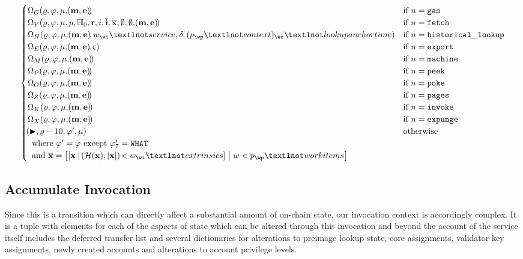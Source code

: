 \begin{align}
\begin{cases}
      \Omega_G(\gascounter, \registers, \memory, \tup{\mathbf{m}, \mathbf{e}}) &\when n = \mathtt{gas} \\
      \Omega_Y(\gascounter, \registers, \memory, p, \zerohash, \mathbf{r}, i, \overline{\mathbf{i}}, \overline{\mathbf{x}}, \none, \none, \tup{\mathbf{m}, \mathbf{e}}) &\when n = \mathtt{fetch}\\
      \Omega_H(\gascounter, \registers, \memory, \tup{\mathbf{m}, \mathbf{e}}, w_\wi¬service, \accounts, (p_\wp¬context)_\wc¬lookupanchortime) &\when n = \mathtt{historical\_lookup}\\
      \Omega_E(\gascounter, \registers, \memory, \tup{\mathbf{m}, \mathbf{e}}, \segoff) &\when n = \mathtt{export}\\
      \Omega_M(\gascounter, \registers, \memory, \tup{\mathbf{m}, \mathbf{e}}) &\when n = \mathtt{machine}\\
      \Omega_P(\gascounter, \registers, \memory, \tup{\mathbf{m}, \mathbf{e}}) &\when n = \mathtt{peek}\\
      \Omega_O(\gascounter, \registers, \memory, \tup{\mathbf{m}, \mathbf{e}}) &\when n = \mathtt{poke}\\
      \Omega_Z(\gascounter, \registers, \memory, \tup{\mathbf{m}, \mathbf{e}}) &\when n = \mathtt{pages}\\
      \Omega_K(\gascounter, \registers, \memory, \tup{\mathbf{m}, \mathbf{e}}) &\when n = \mathtt{invoke}\\
      \Omega_X(\gascounter, \registers, \memory, \tup{\mathbf{m}, \mathbf{e}}) &\when n = \mathtt{expunge}\\
      \tup{\continue, \gascounter - 10, \registers', \memory} &\otherwise\\
      \multicolumn{2}{l}{\where \registers' = \registers \exc \registers'_7 = \mathtt{WHAT}} \\
      \multicolumn{2}{l}{\also \overline{\mathbf{x}} = \sq{\build{
        \sq{\build{
          \mathbf{x}
        }{
          \tup{\blake{\mathbf{x}}, \len{\mathbf{x}}} \orderedin \wiX_\wi¬extrinsics
        }}
      }{
        \wiX \orderedin p_\wp¬workitems
      }}}
    \end{cases}
\end{align}

\subsection{Accumulate Invocation}\label{sec:accumulateinvocation}

Since this is a transition which can directly affect a substantial amount of on-chain state, our invocation context is accordingly complex. It is a tuple with elements for each of the aspects of state which can be altered through this invocation and beyond the account of the service itself includes the deferred transfer list and several dictionaries for alterations to preimage lookup state, core assignments, validator key assignments, newly created accounts and alterations to account privilege levels.

